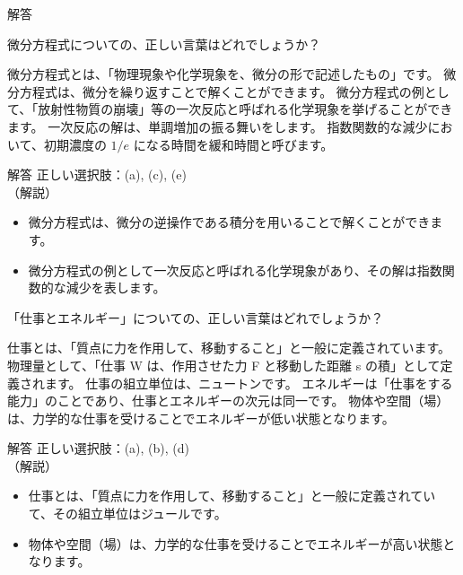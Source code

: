 \documentclass[uplatex,dvipdfmx,a4paper,11pt]{jsarticle}
\begin{document}
\begin{qlist}
\begin{itembox}[l]{解答}
\begin{itemize}
			\end{itemize}
        \end{itembox}
	\qitem 微分方程式についての、正しい言葉はどれでしょうか？
		\begin{qlist2}
			\qitem 微分方程式とは、「物理現象や化学現象を、微分の形で記述したもの」です。
			\qitem 微分方程式は、微分を繰り返すことで解くことができます。
			\qitem 微分方程式の例として、「放射性物質の崩壊」等の一次反応と呼ばれる化学現象を挙げることができます。
			\qitem 一次反応の解は、単調増加の振る舞いをします。
			\qitem 指数関数的な減少において、初期濃度の $1/e$ になる時間を緩和時間と呼びます。
		\end{qlist2}
        \vspace{3mm}
        \begin{itembox}[l]{解答}
            正しい選択肢：(a), (c), (e)\\
            （解説）
			\begin{itemize}
				\item 微分方程式は、微分の逆操作である積分を用いることで解くことができます。
				\item 微分方程式の例として一次反応と呼ばれる化学現象があり、その解は指数関数的な減少を表します。
			\end{itemize}
        \end{itembox}
	\qitem 「仕事とエネルギー」についての、正しい言葉はどれでしょうか？
		\begin{qlist2}
			\qitem 仕事とは、「質点に力を作用して、移動すること」と一般に定義されています。
			\qitem 物理量として、「仕事 W は、作用させた力 F と移動した距離 s の積」として定義されます。
			\qitem 仕事の組立単位は、ニュートンです。
			\qitem エネルギーは「仕事をする能力」のことであり、仕事とエネルギーの次元は同一です。
			\qitem 物体や空間（場）は、力学的な仕事を受けることでエネルギーが低い状態となります。
		\end{qlist2}
        \vspace{3mm}
        \begin{itembox}[l]{解答}
            正しい選択肢：(a), (b), (d)\\
            （解説）
			\begin{itemize}
				\item 仕事とは、「質点に力を作用して、移動すること」と一般に定義されていて、その組立単位はジュールです。
				\item 物体や空間（場）は、力学的な仕事を受けることでエネルギーが高い状態となります。
			\end{itemize}
        \end{itembox}

\end{qlist}
\end{document}
